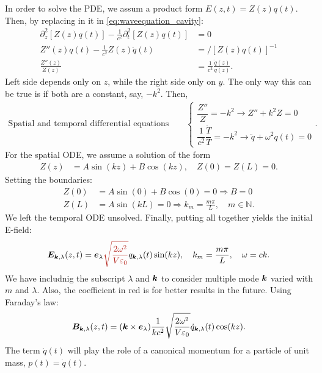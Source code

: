 In order to solve the PDE, we assum a product form $E(z,t)=Z(z)q(t)$. Then, by replacing in it in \eqref{eq:waveequation_cavity}:
\begin{align*}
    \partial_z^2[Z(z)q(t)]-\frac{1}{c^2}\partial_t^2[Z(z)q(t)]&=0\\
    Z''(z)q(t)-\frac{1}{c^2}Z(z)\ddot{q}(t)&=\biggr/[Z(z)q(t)]^{-1}\\
    \frac{Z''(z)}{Z(z)}&=\frac{1}{c^2}\frac{\ddot{q}(z)}{q(z)}.
\end{align*}
Left side depends only on $z$, while the right side only on $y$. The only way this can be true is if both are a constant, say, $-k^2$. Then,
\begin{align*}
    \text{Spatial and temporal differential equations}\qquad
    \left\{\begin{array}{l}
        \dfrac{Z''}{Z}=-k^2\longrightarrow Z''+k^2Z=0\\
        \dfrac{1}{c^2}\dfrac{\ddot{T}}{T}=-k^2\longrightarrow\ddot{q}+\omega^2q(t)=0
    \end{array}\right..
\end{align*} 
For the spatial ODE, we assume a solution of the form 
\begin{align*}
    Z(z)&=A\sin(kz)+B\cos(kz),\quad Z(0)=Z(L)=0.
\end{align*}
Setting the boundaries:
\begin{align*}
    Z(0)&=A\sin(0)+B\cos(0)=0\Longrightarrow B=0\\
    Z(L)&=A\sin(kL)=0\Longrightarrow k_m=\frac{m\pi}{L},\quad m\in\mathbb{N}.
\end{align*}
We left the temporal ODE unsolved.
Finally, putting all together yields the initial E-field:
\begin{align*}
    \bE_{\bk,\lambda}(z,t)=\be_{\lambda}\textcolor{BrickRed}{\sqrt{\frac{2\omega^2}{V\varepsilon_0}}}q_{\bk,\lambda}(t)\sin(kz),\quad k_m=\frac{m\pi}{L},\quad\omega=ck.
    \label{eq:Efieldincavity_generalform}
\end{align*}
We have includnig the subscript $\lambda$ and $\bm{k}$ to consider multiple mode $\bm{k}$ varied with $m$ and $\lambda$. Also, the coefficient in red is for better 
results in the future.
Using Faraday's law:
\begin{align*}
    \bm{B}_{\bm{k},\lambda}(z,t)=(\bm{k}\times\bm{e}_{\lambda})\frac{1}{kc^2}\sqrt{\frac{2\omega^2}{V\varepsilon_0}}\dot{q}_{\bm{k},\lambda}(t)\cos(kz).
\end{align*}
The term $\dot{q}(t)$ will play the role of a canonical momentum for a particle of unit mass, $p(t)=\dot{q}(t)$.
